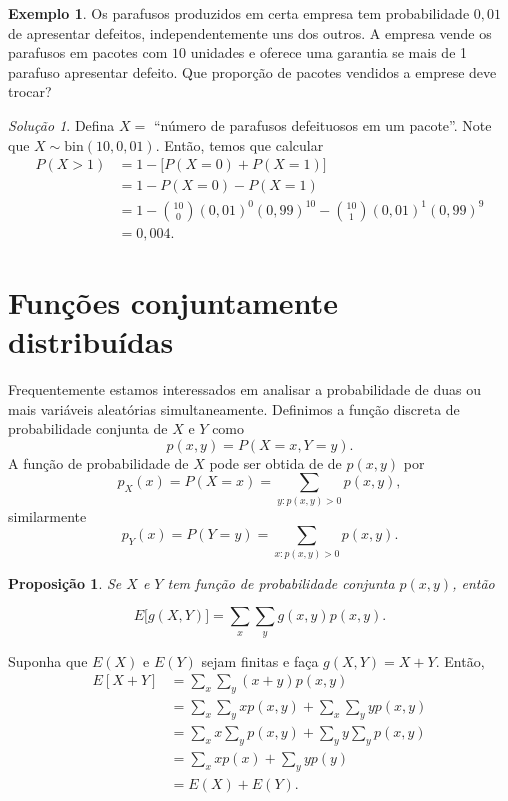 \documentclass[]{book}
\newtheorem{proposition}{Proposição}[chapter]
\theoremstyle{definition}
\theoremstyle{definition}
\newtheorem{example}{Exemplo}[chapter]
\theoremstyle{definition}
\theoremstyle{remark}
\newtheorem*{solution}{Solução}
\begin{document}
\begin{example}
\protect\hypertarget{exm:unnamed-chunk-153}{}{\label{exm:unnamed-chunk-153} }Os parafusos produzidos em certa empresa tem probabilidade \(0{,}01\) de apresentar defeitos, independentemente uns dos outros.
A empresa vende os parafusos em pacotes com \(10\) unidades e oferece uma garantia se mais de 1 parafuso apresentar defeito.
Que proporção de pacotes vendidos a emprese deve trocar?
\end{example}

\begin{solution}
\iffalse{} {Solução. } \fi{}Defina \(X=\) ``número de parafusos defeituosos em um pacote''.
Note que \(X \sim \mathrm{bin}(10, 0{,}01)\).
Então, temos que calcular
\begin{align}
P(X > 1) &= 1 - \big[P(X=0)+P(X=1)\big] \\
&= 1 - P(X=0)-P(X=1)\\
&= 1 - {10 \choose 0}(0{,}01)^0(0{,}99)^10-{10 \choose 1}(0{,}01)^1(0{,}99)^9\\
&= 0{,}004.
\end{align}
\end{solution}

\hypertarget{funuxe7uxf5es-conjuntamente-distribuuxeddas}{%
\section{Funções conjuntamente distribuídas}\label{funuxe7uxf5es-conjuntamente-distribuuxeddas}}

Frequentemente estamos interessados em analisar a probabilidade de duas ou mais variáveis aleatórias simultaneamente.
Definimos a função discreta de probabilidade conjunta de \(X\) e \(Y\) como
\[p(x,y) = P(X=x, Y=y).\]
A função de probabilidade de \(X\) pode ser obtida de de \(p(x,y)\) por
\[p_X(x) = P(X=x) = \sum_{y:p(x,y)>0}p(x,y),\]
similarmente
\[p_Y(x) = P(Y=y) = \sum_{x:p(x,y)>0}p(x,y).\]

\begin{proposition}
\protect\hypertarget{prp:unnamed-chunk-155}{}{\label{prp:unnamed-chunk-155} }Se \(X\) e \(Y\) tem função de probabilidade conjunta \(p(x,y)\), então
\end{proposition}
\[E\big[g(X,Y)\big] = \sum_{x}\sum_{y}g(x,y)p(x,y).\]

Suponha que \(E(X)\) e \(E(Y)\) sejam finitas e faça \(g(X,Y)=X+Y\).
Então,
\begin{align}
E[X+Y] &= \sum_{x}\sum_{y}(x+y)p(x,y)\\
&=\sum_{x}\sum_{y}x p(x,y) + \sum_{x}\sum_{y}y p(x,y)\\
&=\sum_{x}x\sum_{y} p(x,y) + \sum_{y}y\sum_{y} p(x,y)\\
&=\sum_{x}x p(x) + \sum_{y}y p(y)\\
&= E(X) + E(Y).
\label{eq:esperancaSoma}
\end{align}
\end{document}
